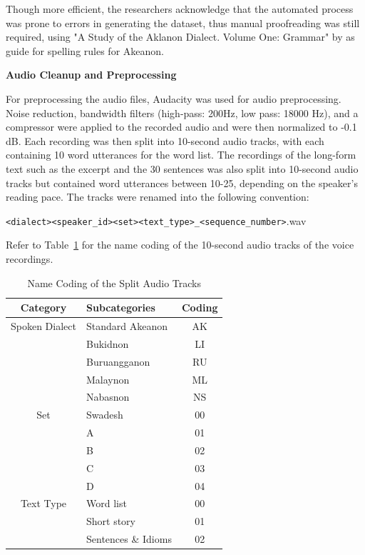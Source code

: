 Though more efficient, the researchers acknowledge that the automated process was prone to errors in generating the dataset, thus manual proofreading was still required, using "A Study of the Aklanon Dialect. Volume One: Grammar" by  as guide for spelling rules for Akeanon.

\textbf{Audio Cleanup and Preprocessing}

For preprocessing the audio files, Audacity was used for audio preprocessing. Noise reduction, bandwidth filters (high-pass: 200Hz, low pass: 18000 Hz), and a compressor were applied to the recorded audio and were then normalized to -0.1 dB. Each recording was then split into 10-second audio tracks, with each containing 10 word utterances for the word list. The recordings of the long-form text such as the excerpt and the 30 sentences was also split into 10-second audio tracks but contained word utterances between 10-25, depending on the speaker's reading pace. The tracks were renamed into the following convention:

\texttt{\textless dialect\textgreater\textless speaker\_id\textgreater\textless set\textgreater\textless text\_type\textgreater\_\textless sequence\_number\textgreater}.wav

Refer to Table~\ref{tab:namecoding} for the name coding of the 10-second audio tracks of the voice recordings.

\begin{table}[H]
   \centering
   \caption{Name Coding of the Split Audio Tracks} \vspace{0.25em}
   \label{tab:namecoding}
   
   \renewcommand{\arraystretch}{1.5} %
   \setlength{\tabcolsep}{10pt} %
   
   \begin{tabular}{|c|p{2in}|c|}
   \hline
   \textbf{Category} & \textbf{Subcategories} & \textbf{Coding} \\
   \hline
   Spoken Dialect & Standard Akeanon & AK \\ 
   & Bukidnon & LI \\ 
   & Buruangganon & RU \\ 
   & Malaynon & ML \\ 
   & Nabasnon & NS \\
   \hline
   Set & Swadesh & 00 \\ 
   & A & 01 \\ 
   & B & 02 \\ 
   & C & 03 \\ 
   & D & 04 \\  
   \hline
   Text Type & Word list & 00 \\ 
   & Short story & 01 \\ 
   & Sentences \& Idioms & 02 \\ 
   \hline
   \end{tabular}
\end{table}
   
